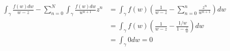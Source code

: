 \documentclass{homework}
\begin{document}
\begin{solution}
                                                                                                                    \begin{align*}
                                                                                                                        \int_{\gamma} \frac{f(w) dw}{w - z} - \sum_{n=0}^N \int_\gamma \frac{f(w) dw}{w^{n+1}}z^n &= \int_\gamma f(w)\left( \frac{1}{w-z} - \sum_{n=0}^n \frac{z^n}{w^{n+1}}\right) dw\\
                                                                                                                            &= \int_\gamma f(w)\left( \frac{1}{w-z} - \frac{1/w}{1-\frac{z}{w}}\right) dw\\
                                                                                                                                &= \int_\gamma 0 dw = 0
                                                                                                                                \end{align*}
                                                                                                                                \end{solution}
                                                                                                                                
\end{document}
